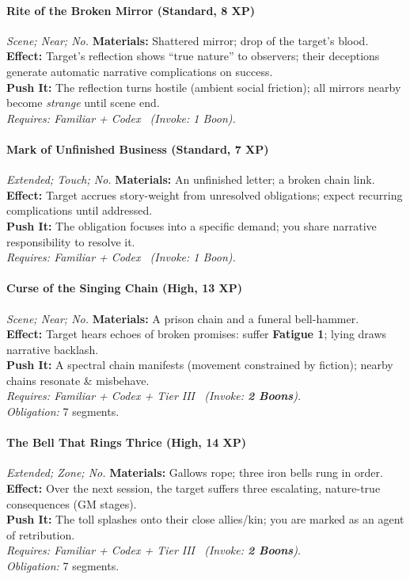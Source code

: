 \paragraph{Rite of the Broken Mirror (Standard, 8 XP)} \emph{Scene; Near; No.}
\textbf{Materials:} Shattered mirror; drop of the target’s blood. \\
\textbf{Effect:} Target’s reflection shows “true nature” to observers; their deceptions generate automatic narrative complications on success. \\
\textbf{Push It:} The reflection turns hostile (ambient social friction); all mirrors nearby become \emph{strange} until scene end. \\
\emph{Requires: Familiar + Codex \ (\textit{Invoke:} 1 Boon).}

\paragraph{Mark of Unfinished Business (Standard, 7 XP)} \emph{Extended; Touch; No.}
\textbf{Materials:} An unfinished letter; a broken chain link. \\
\textbf{Effect:} Target accrues story-weight from unresolved obligations; expect recurring complications until addressed. \\
\textbf{Push It:} The obligation focuses into a specific demand; you share narrative responsibility to resolve it. \\
\emph{Requires: Familiar + Codex \ (\textit{Invoke:} 1 Boon).}

\paragraph{Curse of the Singing Chain (High, 13 XP)} \emph{Scene; Near; No.}
\textbf{Materials:} A prison chain and a funeral bell-hammer. \\
\textbf{Effect:} Target hears echoes of broken promises: suffer \textbf{Fatigue 1}; lying draws narrative backlash. \\
\textbf{Push It:} A spectral chain manifests (movement constrained by fiction); nearby chains resonate \& misbehave. \\
\emph{Requires: Familiar + Codex + Tier III \ (\textit{Invoke:} \textbf{2 Boons}).} \\
\emph{Obligation:} 7 segments.

\paragraph{The Bell That Rings Thrice (High, 14 XP)} \emph{Extended; Zone; No.}
\textbf{Materials:} Gallows rope; three iron bells rung in order. \\
\textbf{Effect:} Over the next session, the target suffers three escalating, nature-true consequences (GM stages). \\
\textbf{Push It:} The toll splashes onto their close allies/kin; you are marked as an agent of retribution. \\
\emph{Requires: Familiar + Codex + Tier III \ (\textit{Invoke:} \textbf{2 Boons}).} \\
\emph{Obligation:} 7 segments.
